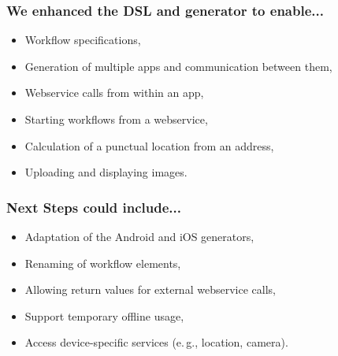 \begin{frame}
    \frametitle{We enhanced the DSL and generator to enable...}
    
    \begin{itemize}
    	\item Workflow specifications,
    	\item Generation of multiple apps and communication between them,
    	\item Webservice calls from within an app,
    	\item Starting workflows from a webservice,
    	\item Calculation of a punctual location from an address,
    	\item Uploading and displaying images.
    \end{itemize}

\end{frame}

\begin{frame}
    \frametitle{Next Steps could include...}

	\begin{itemize}
		\item Adaptation of the Android and iOS generators,
		\item Renaming of workflow elements,
		\item Allowing return values for external webservice calls,
		\item Support temporary offline usage,
		\item Access device-specific services (e.\,g., location, camera).
	\end{itemize}
\end{frame}

